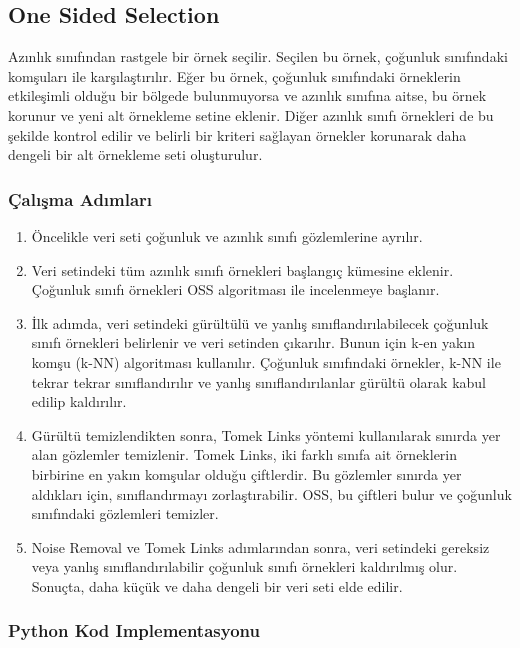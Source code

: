 \newpage

\subsection{One Sided Selection}
Azınlık sınıfından rastgele bir örnek seçilir. Seçilen bu örnek, çoğunluk sınıfındaki komşuları ile karşılaştırılır. Eğer bu örnek, çoğunluk sınıfındaki örneklerin etkileşimli olduğu bir bölgede bulunmuyorsa ve azınlık sınıfına aitse, bu örnek korunur ve yeni alt örnekleme setine eklenir. Diğer azınlık sınıfı örnekleri de bu şekilde kontrol edilir ve belirli bir kriteri sağlayan örnekler korunarak daha dengeli bir alt örnekleme seti oluşturulur.

\subsubsection{Çalışma Adımları}

\begin{enumerate}
    \item Öncelikle veri seti çoğunluk ve azınlık sınıfı gözlemlerine ayrılır.
    \item Veri setindeki tüm azınlık sınıfı örnekleri başlangıç kümesine eklenir. Çoğunluk sınıfı örnekleri OSS algoritması ile incelenmeye başlanır.
    \item İlk adımda, veri setindeki gürültülü ve yanlış sınıflandırılabilecek çoğunluk sınıfı örnekleri belirlenir ve veri setinden çıkarılır. Bunun için k-en yakın komşu (k-NN) algoritması kullanılır. Çoğunluk sınıfındaki örnekler, k-NN ile tekrar tekrar sınıflandırılır ve yanlış sınıflandırılanlar gürültü olarak kabul edilip kaldırılır.
    \item Gürültü temizlendikten sonra, Tomek Links yöntemi kullanılarak sınırda yer alan gözlemler temizlenir. Tomek Links, iki farklı sınıfa ait örneklerin birbirine en yakın komşular olduğu çiftlerdir. Bu gözlemler sınırda yer aldıkları için, sınıflandırmayı zorlaştırabilir. OSS, bu çiftleri bulur ve çoğunluk sınıfındaki gözlemleri temizler.
    \item Noise Removal ve Tomek Links adımlarından sonra, veri setindeki gereksiz veya yanlış sınıflandırılabilir çoğunluk sınıfı örnekleri kaldırılmış olur. Sonuçta, daha küçük ve daha dengeli bir veri seti elde edilir.
\end{enumerate}

\subsubsection{Python Kod Implementasyonu}

